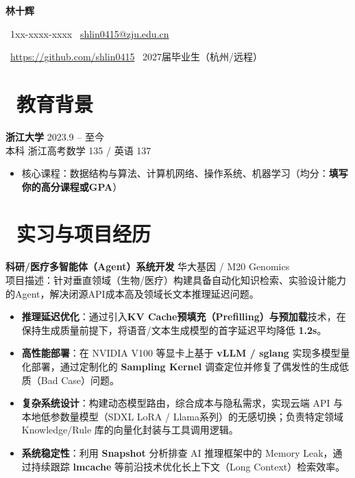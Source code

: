 \documentclass[11pt]{article}
\newlength{\intraProjectTitleSep}
\newcommand{\titlebreak}{\\[\intraProjectTitleSep]}
\begin{document}

\centerline{\LARGE\bfseries{林十辉}} 

\centerline{\normalsize{\faPhone\ 1xx-xxxx-xxxx \quad \faEnvelopeO\ \href{mailto:shlin0415@zju.edu.cn}{shlin0415@zju.edu.cn}}} 

\centerline{\normalsize{\faGithubSquare\ \href{https://github.com/shlin0415}{https://github.com/shlin0415} \quad \faExternalLink\ 2027届毕业生（杭州/远程）}} 
    
\section{\makebox[\widthof{\faGraduationCap}][c]{\color{CVBlue}\faGraduationCap}\ 教育背景}    
\textbf{浙江大学} \hfill 2023.9 -- 至今\\[0.2em] 
本科 \quad 浙江高考数学 135 / 英语 137
\begin{itemize}[nosep]
    \item 核心课程：数据结构与算法、计算机网络、操作系统、机器学习（均分：\textbf{填写你的高分课程或GPA}）
\end{itemize}

\section{\makebox[\widthof{\faUsers}][c]{\color{CVBlue}\faUsers}\ 实习与项目经历}

\textbf{科研/医疗多智能体（Agent）系统开发} \hfill 华大基因 / M20 Genomics \titlebreak
项目描述：针对垂直领域（生物/医疗）构建具备自动化知识检索、实验设计能力的Agent，解决闭源API成本高及领域长文本推理延迟问题。
\begin{itemize}[nosep]
    \item \textbf{推理延迟优化}：通过引入\textbf{KV Cache预填充（Prefilling）与预加载}技术，在保持生成质量前提下，将语音/文本生成模型的首字延迟平均降低 \textbf{1.2s}。
    \item \textbf{高性能部署}：在 NVIDIA V100 等显卡上基于 \textbf{vLLM / sglang} 实现多模型量化部署，通过定制化的 \textbf{Sampling Kernel} 调查定位并修复了偶发性的生成低质（Bad Case）问题。
    \item \textbf{复杂系统设计}：构建动态模型路由，综合成本与隐私需求，实现云端 API 与本地低参数量模型（SDXL LoRA / Llama系列）的无感切换；负责特定领域 Knowledge/Rule 库的向量化封装与工具调用逻辑。
    \item \textbf{系统稳定性}：利用 \textbf{Snapshot} 分析排查 AI 推理框架中的 Memory Leak，通过持续跟踪 \textbf{lmcache} 等前沿技术优化长上下文（Long Context）检索效率。
\end{itemize}
\end{document}
